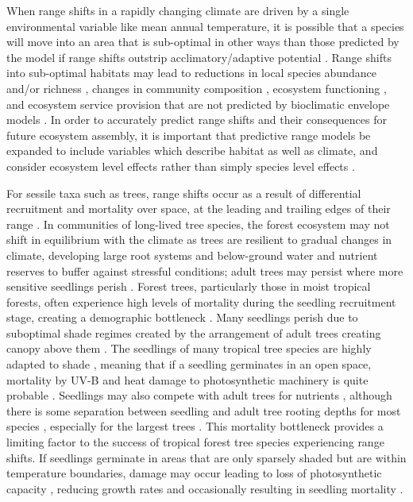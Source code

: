 \documentclass[a4paper, 11pt]{article}
\begin{document}
When range shifts in a rapidly changing climate are driven by a single environmental variable like mean annual temperature, it is possible that a species will move into an area that is sub-optimal in other ways than those predicted by the model if range shifts outstrip acclimatory/adaptive potential \citep{}. Range shifts into sub-optimal habitats may lead to reductions in local species abundance and/or richness \citep{Colwell2008}, changes in community composition \citep{}, ecosystem functioning \citep{Bellard2012}, and ecosystem service provision that are not predicted by bioclimatic envelope models \citep{Dobson2011, Isbell2011}. In order to accurately predict range shifts and their consequences for future ecosystem assembly, it is important that predictive range models be expanded to include variables which describe habitat as well as climate, and consider ecosystem level effects rather than simply species level effects \citep{}.

For sessile taxa such as trees, range shifts occur as a result of differential recruitment and mortality over space, at the leading and trailing edges of their range \citep{}. 
In communities of long-lived tree species, the forest ecosystem may not shift in equilibrium with the climate as trees are resilient to gradual changes in climate, developing large root systems and below-ground water and nutrient reserves to buffer against stressful conditions; adult trees may persist where more sensitive seedlings perish \citep{}. Forest trees, particularly those in moist tropical forests, often experience high levels of mortality during the seedling recruitment stage, creating a demographic bottleneck \citep{Coomes2000}. Many seedlings perish due to suboptimal shade regimes created by the arrangement of adult trees creating canopy above them \citep{}. The seedlings of many tropical tree species are highly adapted to shade \citep{}, meaning that if a seedling germinates in an open space, mortality by UV-B and heat damage to photosynthetic machinery is quite probable \citep{}. Seedlings may also compete with adult trees for nutrients \citep{}, although there is some separation between seedling and adult tree rooting depths for most species \citep{}, especially for the largest trees \citep{}. This mortality bottleneck provides a limiting factor to the success of tropical forest tree species experiencing range shifts. If seedlings germinate in areas that are only sparsely shaded but are within temperature boundaries, damage may occur leading to loss of photosynthetic capacity \citep{}, reducing growth rates and occasionally resulting in seedling mortality \citep{}.  
\end{document}
